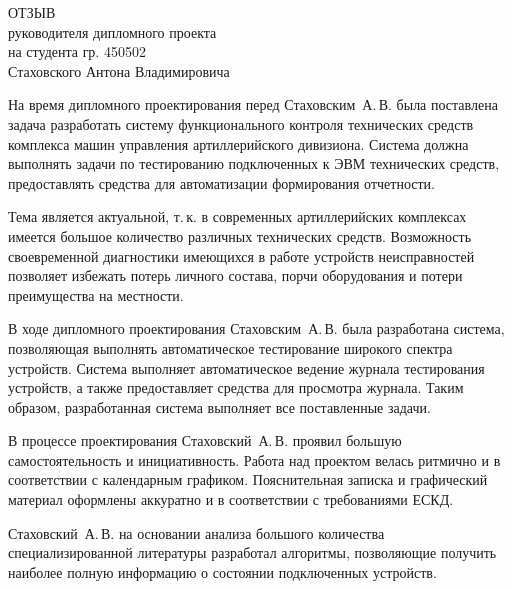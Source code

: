 
\thispagestyle{empty}


{\small
  \begin{center}
    \begin{minipage}{0.8\textwidth}
      \begin{center}
        {\normalsize ОТЗЫВ}\\
	      руководителя дипломного проекта\\
	      на студента гр. 450502\\
	      Стаховского Антона Владимировича\\
      \end{center}
    \end{minipage}
  \end{center}

На время дипломного проектирования перед Стаховским~А.\,В. была поставлена задача разработать систему
	функционального контроля технических средств комплекса машин управления артиллерийского дивизиона. Система
	должна выполнять задачи по тестированию подключенных к ЭВМ технических средств, предоставлять средства для
	автоматизации формирования отчетности.

Тема является актуальной, т.\,к. в современных артиллерийских комплексах имеется большое количество различных
	технических средств.
Возможность своевременной диагностики имеющихся в работе устройств неисправностей позволяет избежать потерь личного
	состава, порчи оборудования и потери преимущества на местности.

В ходе дипломного проектирования Стаховским~А.\,В. была разработана система, позволяющая выполнять автоматическое
	тестирование широкого спектра устройств. Система выполняет автоматическое ведение журнала
	тестирования устройств, а также предоставляет средства для просмотра журнала. Таким образом, разработанная
	система выполняет все поставленные задачи.

В процессе проектирования Стаховский~А.\,В. проявил большую самостоятельность и инициативность.
Работа над проектом велась ритмично и в соответствии с календарным графиком.
Пояснительная записка и графический материал оформлены аккуратно и в соответствии с требованиями ЕСКД.

Стаховский~А.\,В. на основании анализа большого количества специализированной литературы разработал алгоритмы,
	позволяющие получить наиболее полную информацию о состоянии подключенных устройств.


}
